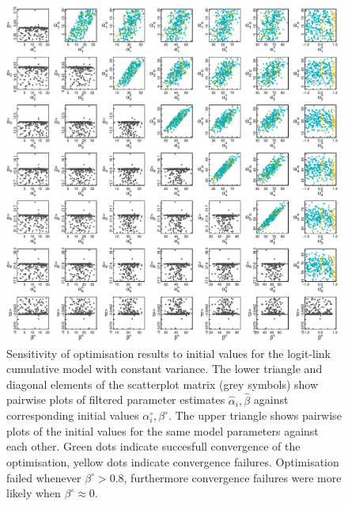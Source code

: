 \begin{figure}[p]
  \centering
  \includegraphics[width=\textwidth]{../figures/figS2_initial_value_sensitivity_logit.pdf}
  \caption{Sensitivity of optimisation results to initial values for the logit-link cumulative model with constant variance. The lower triangle and diagonal elements of the scatterplot matrix (grey symbols) show pairwise plots of filtered parameter estimates $\hat{\alpha}_i, \hat{\beta}$  against corresponding initial values $\alpha^{\circ}_i, \beta^{\circ}$. The upper triangle shows pairwise plots of the initial values for the same model parameters against each other. Green dots indicate succesfull convergence of the optimisation, yellow dots indicate convergence failures. Optimisation failed whenever $\beta^{\circ}>0.8$, furthermore convergence failures were more likely when $\beta^{\circ}\approx 0$.}
  \label{fig:figS2}
\end{figure} 

